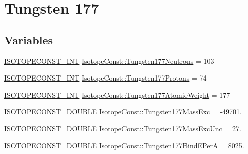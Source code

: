 \hypertarget{group___isotope_const-_tungsten-_w177}{}\section{Tungsten 177}
\label{group___isotope_const-_tungsten-_w177}
\subsection*{Variables}
\begin{DoxyCompactItemize}
\item 
\mbox{\hyperlink{group___isotope_const-_macros_ga5f18360b3e99483a35c32d789e62621c}{I\+S\+O\+T\+O\+P\+E\+C\+O\+N\+S\+T\+\_\+\+I\+NT}} \mbox{\hyperlink{group___isotope_const-_tungsten-_w177_gaccff82a9d6416382444a9a5a0a6e96f5}{Isotope\+Const\+::\+Tungsten177\+Neutrons}} = 103
\item 
\mbox{\hyperlink{group___isotope_const-_macros_ga5f18360b3e99483a35c32d789e62621c}{I\+S\+O\+T\+O\+P\+E\+C\+O\+N\+S\+T\+\_\+\+I\+NT}} \mbox{\hyperlink{group___isotope_const-_tungsten-_w177_ga7a71f8f22fa59f6a711e720ef12cef14}{Isotope\+Const\+::\+Tungsten177\+Protons}} = 74
\item 
\mbox{\hyperlink{group___isotope_const-_macros_ga5f18360b3e99483a35c32d789e62621c}{I\+S\+O\+T\+O\+P\+E\+C\+O\+N\+S\+T\+\_\+\+I\+NT}} \mbox{\hyperlink{group___isotope_const-_tungsten-_w177_gacea8836afb7af1e8e597c51a5f8427da}{Isotope\+Const\+::\+Tungsten177\+Atomic\+Weight}} = 177
\item 
\mbox{\hyperlink{group___isotope_const-_macros_ga8f45a7272ce02c0b4c65c44636ed719a}{I\+S\+O\+T\+O\+P\+E\+C\+O\+N\+S\+T\+\_\+\+D\+O\+U\+B\+LE}} \mbox{\hyperlink{group___isotope_const-_tungsten-_w177_ga5b14eafe2ca0598552087d398207648f}{Isotope\+Const\+::\+Tungsten177\+Mass\+Exc}} = -\/49701.
\item 
\mbox{\hyperlink{group___isotope_const-_macros_ga8f45a7272ce02c0b4c65c44636ed719a}{I\+S\+O\+T\+O\+P\+E\+C\+O\+N\+S\+T\+\_\+\+D\+O\+U\+B\+LE}} \mbox{\hyperlink{group___isotope_const-_tungsten-_w177_ga53eb87ae611cd2103a322a70c297e9b5}{Isotope\+Const\+::\+Tungsten177\+Mass\+Exc\+Unc}} = 27.
\item 
\mbox{\hyperlink{group___isotope_const-_macros_ga8f45a7272ce02c0b4c65c44636ed719a}{I\+S\+O\+T\+O\+P\+E\+C\+O\+N\+S\+T\+\_\+\+D\+O\+U\+B\+LE}} \mbox{\hyperlink{group___isotope_const-_tungsten-_w177_ga864eb99304f1186a76d77bd545317d71}{Isotope\+Const\+::\+Tungsten177\+Bind\+E\+PerA}} = 8025.
\item 

\end{DoxyCompactItemize}
